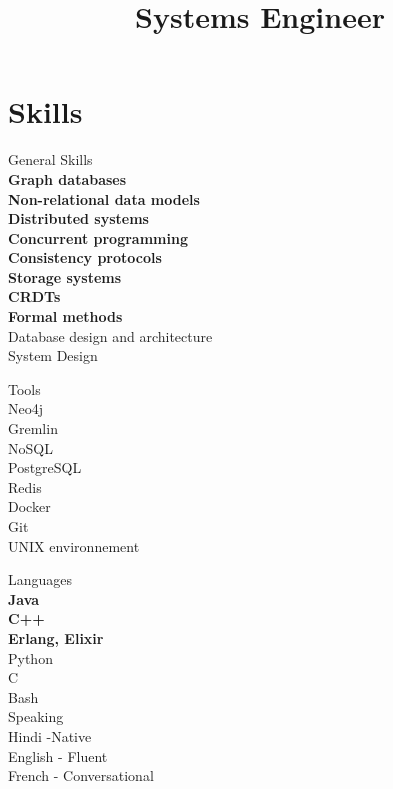 \documentclass[10pt,a4paper,sans]{moderncv}        %
\title{Systems Engineer}
\begin{document}
\makecvtitle

\vspace{-1cm}

\section{Skills}
\closesection{}


\begin{multicols}{3}
    {\large \color{color1} General Skills}\\
    \textbf{Graph databases}\\
    \textbf{Non-relational data models}\\
    \textbf{Distributed systems}\\
    \textbf{Concurrent programming}\\
    \textbf{Consistency protocols}\\
    \textbf{Storage systems}\\
    \textbf{CRDTs}\\
    \textbf{Formal methods}\\
    Database design and architecture\\
    System Design
    

\vfill\null\columnbreak


{\large \color{color1}  Tools} \\
    Neo4j\\
    Gremlin\\
    NoSQL\\
    PostgreSQL\\
    Redis\\
    Docker\\ 
    Git\\ 
    UNIX environnement\\ 

\vfill\null\columnbreak

{\large \color{color1}  Languages}\\
\textbf{Java}\\ 
\textbf{C++}\\
\textbf{Erlang, Elixir}\\
Python\\
C\\
Bash\\

{\large \color{color1} Speaking}\\
    Hindi -Native\\
    English - Fluent\\
    French - Conversational\\    

\vfill\null\columnbreak

\end{multicols}
\end{document}
